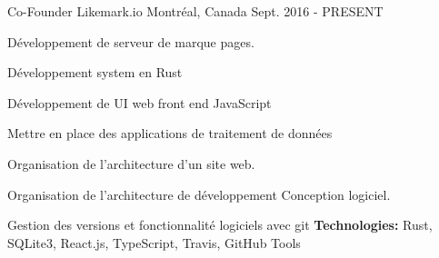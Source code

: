 \begin{cventries}
  \cventry
    {Co-Founder}
    {Likemark.io}
    {Montréal, Canada}
    {Sept. 2016 - PRESENT}
    {
      \begin{cvitems}
        \item {Développement de serveur de marque pages.}
        \item {Développement system en Rust}
        \item {Développement de UI web front end JavaScript}
        \item {Mettre en place des applications de traitement de données}
        \item {Organisation de l’architecture d’un site web.}
        \item {Organisation de l’architecture de développement
        Conception logiciel.}
        \item {Gestion des versions et fonctionnalité logiciels avec git}
        \newline
        \vspace{3mm}
        \textbf{Technologies: }{ Rust, SQLite3, React.js, TypeScript, Travis, GitHub Tools}
      \end{cvitems}
    }
\end{cventries}
\vspace{5mm}
